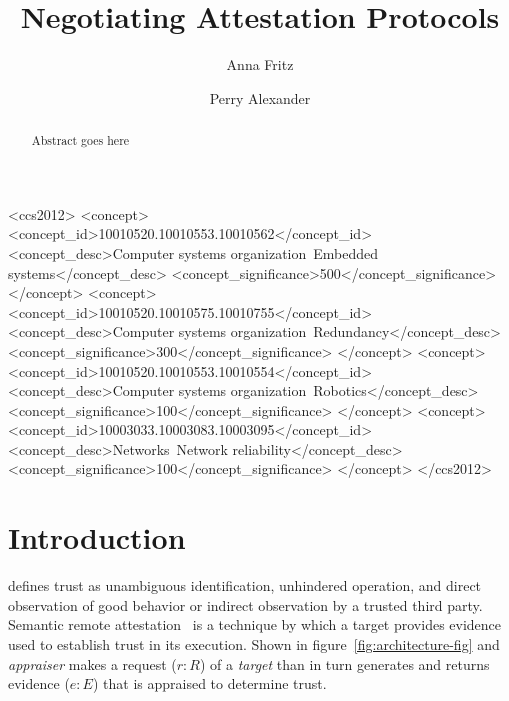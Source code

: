 \documentclass[sigconf,authordraft]{acmart}
\begin{document}
\title{Negotiating Attestation Protocols}

\author{Anna Fritz}
\author{Perry Alexander}

\renewcommand{\shortauthors}{Fritz and Alexander}

\begin{abstract}
  Abstract goes here
\end{abstract}

\begin{CCSXML}
<ccs2012>
 <concept>
  <concept_id>10010520.10010553.10010562</concept_id>
  <concept_desc>Computer systems organization~Embedded systems</concept_desc>
  <concept_significance>500</concept_significance>
 </concept>
 <concept>
  <concept_id>10010520.10010575.10010755</concept_id>
  <concept_desc>Computer systems organization~Redundancy</concept_desc>
  <concept_significance>300</concept_significance>
 </concept>
 <concept>
  <concept_id>10010520.10010553.10010554</concept_id>
  <concept_desc>Computer systems organization~Robotics</concept_desc>
  <concept_significance>100</concept_significance>
 </concept>
 <concept>
  <concept_id>10003033.10003083.10003095</concept_id>
  <concept_desc>Networks~Network reliability</concept_desc>
  <concept_significance>100</concept_significance>
 </concept>
</ccs2012>
\end{CCSXML}



\maketitle

\section{Introduction}

\citet{Martin:08:The-ten-page-in} defines trust as unambiguous
identification, unhindered operation, and direct observation of good
behavior or indirect observation by a trusted third party.  Semantic
remote attestation~\cite{Haldar:04:Semantic-Remote} is a technique by
which a target provides evidence used to establish trust in its
execution.  Shown in figure~\ref{fig:architecture-fig} and
\emph{appraiser} makes a request ($r:R$) of a \emph{target} than in
turn generates and returns evidence ($e:E$) that is appraised to
determine trust.
\end{document}
